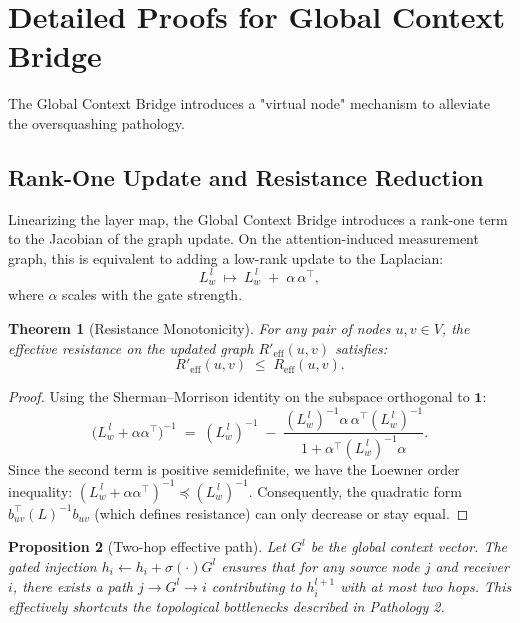 \documentclass{article}
\theoremstyle{plain}
\newtheorem{theorem}{Theorem}[section]
\newtheorem{proposition}[theorem]{Proposition}
\theoremstyle{definition}
\theoremstyle{remark}
\begin{document}
{%

\section{Detailed Proofs for Global Context Bridge}
\label{sec:proof_global}

The Global Context Bridge introduces a "virtual node" mechanism to alleviate the oversquashing pathology.

\subsection{Rank-One Update and Resistance Reduction}
Linearizing the layer map, the Global Context Bridge introduces a rank-one term to the Jacobian of the graph update. On the attention-induced measurement graph, this is equivalent to adding a low-rank update to the Laplacian:
\begin{equation}
L_w^{\,l}\ \longmapsto\ L_w^{\,l}\;+\;\alpha\,\alpha^\top,
\end{equation}
where $\alpha$ scales with the gate strength.

\begin{theorem}[Resistance Monotonicity]
For any pair of nodes $u,v \in V$, the effective resistance on the updated graph $R'_{\mathrm{eff}}(u,v)$ satisfies:
\begin{equation}
R'_{\mathrm{eff}}(u,v) \;\le\; R_{\mathrm{eff}}(u,v).
\end{equation}
\end{theorem}
\begin{proof}
Using the Sherman--Morrison identity on the subspace orthogonal to $\mathbf{1}$:
\begin{equation}
\big(L_w^{\,l}+\alpha\alpha^\top\big)^{-1}
\;=\;
(L_w^{\,l})^{-1}
\;-\;
\frac{(L_w^{\,l})^{-1}\alpha\,\alpha^\top (L_w^{\,l})^{-1}}{1+\alpha^\top (L_w^{\,l})^{-1}\alpha}.
\end{equation}
Since the second term is positive semidefinite, we have the Loewner order inequality:
$(L_w^{\,l}+\alpha\alpha^\top)^{-1} \preceq (L_w^{\,l})^{-1}$.
Consequently, the quadratic form $b_{uv}^\top (L)^{-1} b_{uv}$ (which defines resistance) can only decrease or stay equal.
\end{proof}

\begin{proposition}[Two-hop effective path]
Let $G^l$ be the global context vector. The gated injection $h_i \leftarrow h_i + \sigma(\cdot)G^l$ ensures that for any source node $j$ and receiver $i$, there exists a path $j\!\to\!G^l\!\to\!i$ contributing to $h_i^{l+1}$ with at most two hops. This effectively shortcuts the topological bottlenecks described in Pathology 2.
\end{proposition}

}
\end{document}
